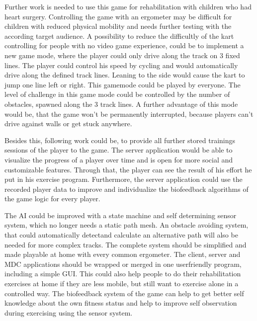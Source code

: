\begin{multicols}{2}
Further work is needed to use this game for rehabilitation with children who had heart surgery. Controlling the game with an ergometer may be difficult for children with reduced physical mobility and needs further testing with the according target audience. A possibility to reduce the difficultly of the kart controlling for people with no video game experience, could be to implement a new game mode, where the player could only drive along the track on 3 fixed lines. The player could control his speed by cycling and would automatically drive along the defined track lines. Leaning to the side would cause the kart to jump one line left or right. This gamemode could be played by everyone. The level of challenge in this game mode could be controlled by the number of obstacles, spawned along the 3 track lines. A further advantage of this mode would be, that the game won't be permanently interrupted, because players can't drive against walls or get stuck anywhere.

Besides this, following work could be, to provide all further stored trainings sessions of the player to the game. The server application would be able to visualize the progress of a player over time and is open for more social and customizable features. Through that, the player can see the result of his effort he put in his exercise program. Furthermore, the server application could use the recorded player data to improve and individualize the biofeedback algorithms of the game logic for every player.

The AI could be improved with a state machine and self determining sensor system, which no
longer needs a static path mesh. An obstacle avoiding system, that could automatically detectand calculate an alternative path will also be needed for more complex tracks.
The complete system should be simplified and made playable at home with every common
ergometer. The client, server and MDC applications should be wrapped or merged in one userfriendly program, including a simple GUI. This could also help people to do their rehabilitation exercises at home if they are less mobile, but still want to exercise alone in a controlled way. The biofeedback system of the game can help to get better self knowledge about the own fitness status and help to improve self observation during exercising using the sensor system.

\end{multicols}







